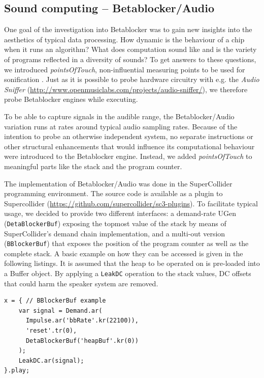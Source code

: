 \documentclass[letterpaper, 12pt]{article}
\begin{document}
\subsection{Sound computing -- Betablocker/Audio}
\label{sub:sound_computing}

One goal of the investigation into Betablocker was to gain new insights into the aesthetics of typical data processing.
How dynamic is the behaviour of a chip when it runs an algorithm?
What does computation sound like and is the variety of programs reflected in a diversity of sounds?
To get answers to these questions, we introduced \emph{pointsOfTouch}, non-influential measuring points to be used for sonification  \citep{bovermann2011-the}.
Just as it is possible to probe hardware circuitry with e.g. the \emph{Audio Sniffer}  (\url{http://www.openmusiclabs.com/projects/audio-sniffer/}), we therefore probe Betablocker engines while executing.

To be able to capture signals in the audible range, the Betablocker/Audio variation runs at rates around typical audio sampling rates.
Because of the intention to probe an otherwise independent system, no separate instructions or other structural enhancements that would influence its computational behaviour were introduced to the Betablocker engine.
Instead, we added \emph{pointsOfTouch} to meaningful parts like the stack and the program counter.

The implementation of Betablocker/Audio was done in the SuperCollider programming environment. 
The source code is available as a plugin to Supercollider (\url{https://github.com/supercollider/sc3-plugins}).
To facilitate typical usage, we decided to provide two different interfaces: a demand-rate UGen (\texttt{DetaBlockerBuf}) exposing the topmost value of the stack by means of SuperCollider's demand chain implementation, and a multi-out version (\texttt{BBlockerBuf}) that exposes the position of the program counter as well as  the complete stack.
A basic example on how they can be accessed is given in the following listings. 
It is assumed that the heap to be operated on is pre-loaded into a Buffer object.
By applying a \texttt{LeakDC} operation to the stack values, DC offsets that could harm the speaker system are removed.


\begin{Verbatim}[fontfamily=courier, xleftmargin=\parindent]
x = { // BBlockerBuf example
	var signal = Demand.ar(
	  Impulse.ar('bbRate'.kr(22100)),
	  'reset'.tr(0),
	  DetaBlockerBuf('heapBuf'.kr(0))
	);
	LeakDC.ar(signal);
}.play;
\end{Verbatim}
\end{document}
